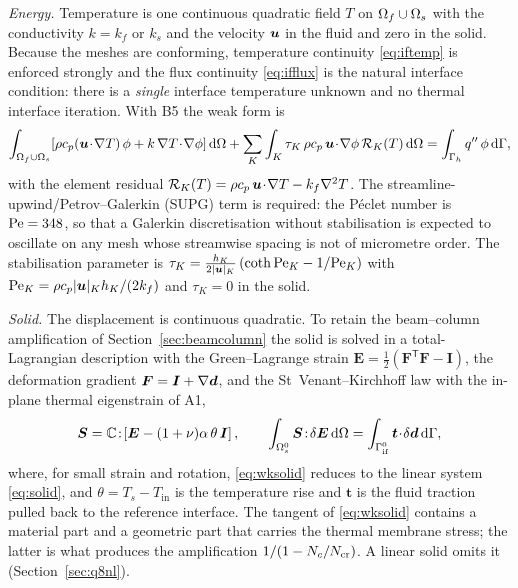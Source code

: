 \emph{Energy.} Temperature is one continuous quadratic field $T$ on $\Omega_f\cup\Omega_s$ with the
conductivity $k=k_f$ or $k_s$ and the velocity $\bm{u}$ in the fluid and zero in the solid. Because the
meshes are conforming, temperature continuity \eqref{eq:iftemp} is enforced strongly and the flux
continuity \eqref{eq:ifflux} is the natural interface condition: there is a \emph{single} interface
temperature unknown and no thermal interface iteration. With B5 the weak form is
\begin{equation}
\int_{\Omega_f\cup\Omega_s}\!\left[\rho c_p(\bm{u}\!\cdot\!\nabla T)\,\phi+k\,\nabla T\!\cdot\!\nabla\phi\right]\mathrm{d}\Omega
+\sum_K\int_K\tau_K\,\rho c_p\,\bm{u}\!\cdot\!\nabla\phi\,\mathcal R_K(T)\,\mathrm{d}\Omega=\int_{\Gamma_h}q^{\prime\prime}\,\phi\,\mathrm{d}\Gamma,
\label{eq:wkenergy}
\end{equation}
with the element residual $\mathcal R_K(T)=\rho c_p\,\bm{u}\!\cdot\!\nabla T-k_f\nabla^2T$. The
streamline-upwind/Petrov--Galerkin (SUPG) term \citep{brooks1982streamline} is required: the P\'eclet number is
$\mathrm{Pe}=348$, so that a Galerkin discretisation without stabilisation is expected to oscillate on any mesh whose
streamwise spacing is not of micrometre order. The stabilisation parameter is
$\tau_K=\tfrac{h_K}{2|\bm{u}|_K}\left(\coth\mathrm{Pe}_K-1/\mathrm{Pe}_K\right)$ with
$\mathrm{Pe}_K=\rho c_p|\bm{u}|_Kh_K/(2k_f)$ and $\tau_K=0$ in the solid.

\emph{Solid.} The displacement is continuous quadratic. To retain the beam--column amplification of
Section~\ref{sec:beamcolumn} the solid is solved in a total-Lagrangian description with the
Green--Lagrange strain $\bm E=\tfrac12(\bm F^{\mathsf T}\bm F-\bm I)$, the deformation gradient
$\bm F=\bm I+\nabla\bm{d}$, and the St~Venant--Kirchhoff law with the in-plane thermal eigenstrain of A1,
\begin{equation}
\bm S=\mathbb C\!:\!\left[\bm E-(1+\nu)\alpha\,\theta\,\bm I\right],\qquad
\int_{\Omega_s^0}\bm S\!:\!\delta\bm E\,\mathrm{d}\Omega=\int_{\Gamma_{\mathrm{if}}^0}\bm t\!\cdot\!\delta\bm{d}\,\mathrm{d}\Gamma,
\label{eq:wksolid}
\end{equation}
where, for small strain and rotation, \eqref{eq:wksolid} reduces to the linear system \eqref{eq:solid}, and $\theta=T_s-T_{\mathrm{in}}$ is the temperature rise and $\bm t$ is the fluid traction pulled back to
the reference interface. The tangent of \eqref{eq:wksolid} contains a material part and a geometric part
that carries the thermal membrane stress; the latter is what produces the amplification
$1/(1-N_c/N_{\mathrm{cr}})$. A linear solid omits it (Section~\ref{sec:q8nl}).

